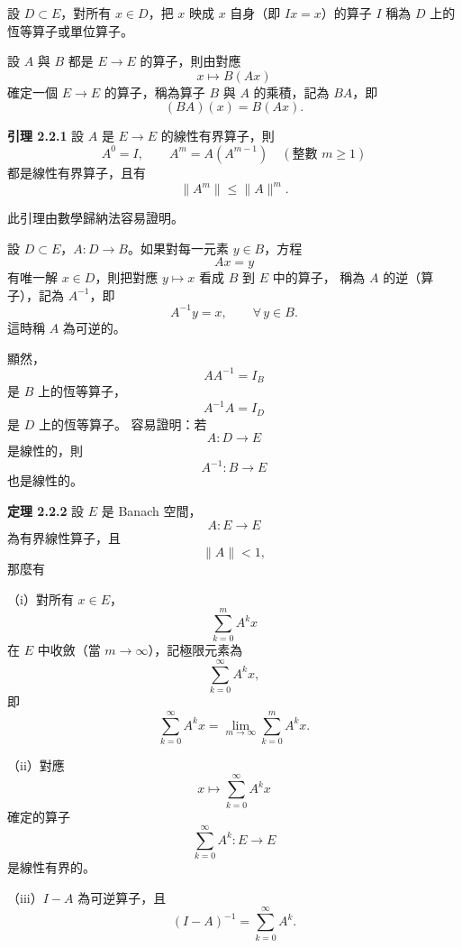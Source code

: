 \documentclass[11pt,a4paper,twoside]{article}
\newcommand{\pnum}[1]{%
    \makebox[0pt][r]{%
        \scriptsize\textbf{[#1]}\hspace{0.7em}%
    }%
}
\begin{document}
\noindent
\pnum{82}
設 $D\subset E$，對所有 $x\in D$，把 $x$ 映成 $x$ 自身（即 $Ix=x$）的算子 $I$
稱為 $D$ 上的恆等算子或單位算子。

\noindent
\pnum{83}
設 $A$ 與 $B$ 都是 $E\to E$ 的算子，則由對應
\[
    x\longmapsto B(Ax)
\]
確定一個 $E\to E$ 的算子，稱為算子 $B$ 與 $A$ 的乘積，記為 $BA$，即
\[
    (BA)(x)=B(Ax).
\]

\noindent
\pnum{84}
\textbf{引理 2.2.1}\quad
設 $A$ 是 $E\to E$ 的線性有界算子，則
\[
    A^0=I,
    \qquad
    A^m=A(A^{m-1})
    \quad
    (\text{整數 }m\ge1)
\]
都是線性有界算子，且有
\begin{equation}
    \|A^m\|
    \le
    \|A\|^m.
    \tag{2.2.6}
\end{equation}

此引理由數學歸納法容易證明。

\noindent
\pnum{85}
設 $D\subset E$，$A:D\to B$。如果對每一元素 $y\in B$，方程
\begin{equation}
    Ax=y
    \tag{2.2.7}
\end{equation}
有唯一解 $x\in D$，則把對應 $y\mapsto x$ 看成 $B$ 到 $E$ 中的算子，
稱為 $A$ 的逆（算子），記為 $A^{-1}$，即
\[
    A^{-1}y=x,
    \qquad
    \forall\,y\in B.
\]
這時稱 $A$ 為可逆的。

顯然，
\[
    AA^{-1}=I_B
\]
是 $B$ 上的恆等算子，
\[
    A^{-1}A=I_D
\]
是 $D$ 上的恆等算子。
容易證明：若
\[
    A:D\to E
\]
是線性的，則
\[
    A^{-1}:B\to E
\]
也是線性的。

\noindent
\pnum{86}
\textbf{定理 2.2.2}\quad
設 $E$ 是 Banach 空間，
\[
    A:E\to E
\]
為有界線性算子，且
\[
    \|A\|<1,
\]
那麼有

\newpage

\noindent
\pnum{87}
（i）對所有 $x\in E$，
\[
    \sum_{k=0}^{m}A^k x
\]
在 $E$ 中收斂（當 $m\to\infty$），記極限元素為
\[
    \sum_{k=0}^{\infty}A^k x,
\]
即
\begin{equation}
    \sum_{k=0}^{\infty}A^k x
    =
    \lim_{m\to\infty}
    \sum_{k=0}^{m}A^k x.
    \tag{2.2.8}
\end{equation}

\noindent
（ii）對應
\[
    x\longmapsto
    \sum_{k=0}^{\infty}A^k x
\]
確定的算子
\[
    \sum_{k=0}^{\infty}A^k:E\to E
\]
是線性有界的。

\noindent
（iii）$I-A$ 為可逆算子，且
\begin{equation}
    (I-A)^{-1}
    =
    \sum_{k=0}^{\infty}A^k.
    \tag{2.2.9}
\end{equation}
\end{document}
